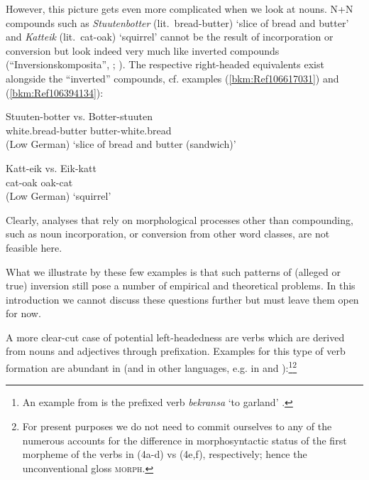 \documentclass[output=paper
  ,nobabel
  ,draftmode
  ,colorlinks, citecolor=brown
]{langscibook}
\begin{document}
However, this picture gets even more complicated when we look at nouns. N+N compounds such as
\emph{Stuutenbotter} (lit.\ bread-butter) `slice of bread and butter' and \emph{Katteik}
(lit.\ cat-oak) `squirrel' cannot be the result of incorporation or conversion but look indeed very
much like inverted compounds (``Inversionskomposita'', \citealt[61–62]{OrtnerOrtner1984};
\citealt{Olsen2015a}). The respective right-headed equivalents exist alongside the “inverted''
compounds, cf. examples (\ref{bkm:Ref106617031}) and (\ref{bkm:Ref106394134}):

\ea
\label{bkm:Ref106617031}
\gll Stuuten-botter     vs.     Botter-stuuten\\
     white.bread-butter {}  butter-white.bread\\\hfill(Low German)
\glt   `slice of bread and butter (sandwich)'
\z

\ea
\label{bkm:Ref106394134}
\gll   Katt-eik   vs.   Eik-katt\\
       cat-oak    {}   oak-cat \\\hfill(Low German)
\glt   `squirrel'
\z

\noindent
Clearly, analyses that rely on morphological processes other than compounding, such as noun
incorporation, or conversion from other word classes, are not feasible here.

What we illustrate by these few examples is that such patterns of (alleged or true) inversion still
pose a number of empirical and theoretical problems. In this introduction we cannot discuss these
questions further but must leave them open for now.

A more clear-cut case of potential left-headedness are verbs which are derived from nouns and
adjectives through prefixation. Examples for this type of verb formation are abundant in  (and
in other  languages, e.g. in  and ):\footnote{An example from  is the
  prefixed verb \emph{bekransa} `to garland' \citep[90]{Schmidt1996}.}\footnote{For present purposes we do not need to commit ourselves to any of the numerous accounts for the difference in morphosyntactic status of the first morpheme of the verbs in (4a-d) vs (4e,f), respectively; hence the unconventional gloss \textsc{morph}.}
\end{document}
